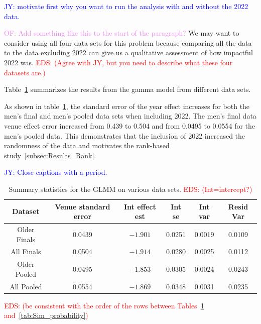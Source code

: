 \documentclass[12pt, letterpaper, titlepage]{article}
\newcommand{\jy}[1]{\textcolor{blue}{JY: #1}}
\newcommand{\eds}[1]{\textcolor{red}{EDS: (#1)}}
\newcommand{\of}[1]{\textcolor{violet}{OF: #1}}
\begin{document}
\jy{motivate first why you want to run the analysis with and without the 2022 data.}

\of{Add something like this to the start of the paragraph?}
We may want to consider using all four data sets for this problem because
comparing all the data to the data excluding 2022 can give us a qualitative
assessment of how impactful 2022 was.
\eds{Agree with JY, but you need to describe what these four datasets are.}

Table~\ref{tab:Gamma_parameters} summarizes the results from the gamma model 
from different data sets.


As shown in table~\ref{tab:Gamma_parameters}, the standard error of the year
effect increases for both the men's final and men's pooled data sets when
including 2022.  The men's final data venue effect error increased from 0.439
to 0.504 and from 0.0495 to 0.0554 for the men's pooled data.  This demonstrates
that the inclusion of 2022 increased the randomness of the data and motivates
the rank-based study~\ref{subsec:Results_Rank}.

\jy{Close captions with a period.}
\begin{table}
  \centering
  \caption{Summary statistics for the GLMM on various data sets. 
	\eds{Int=intercept?}}
  \begin{tabular}{c c c c c c}
      \toprule
      Dataset & Venue standard error & Int effect est & Int se & Int var & Resid Var \\
      \midrule
      Older Finals & 0.0439 & $-1.901$ & 0.0251 & 0.0019 & 0.0109 \\
      All Finals & 0.0504 & $-1.914$ & 0.0280 & 0.0025 & 0.0112 \\
      Older Pooled & 0.0495 & $-1.853$ & 0.0305 & 0.0024 & 0.0243 \\
      All Pooled & 0.0554 & $-1.869$ & 0.0348 & 0.0031 & 0.0235 \\
      \bottomrule
  \end{tabular}
  \label{tab:Gamma_parameters}
\end{table}

\eds{be consistent with the order of the rows between 
Tables~\ref{tab:Gamma_parameters} and~\ref{tab:Sim_probability}}
\end{document}
